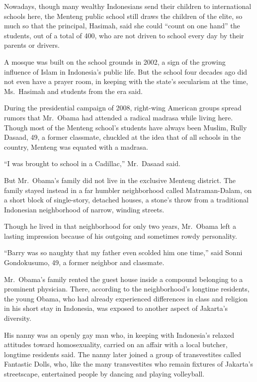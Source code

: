 ﻿\documentclass[12pt]{article}
\begin{document}
Nowadays, though many wealthy Indonesians send their children to international schools here, the
Menteng public school still draws the children of the elite, so much so that the principal, Hasimah,
said she could ``count on one hand'' the students, out of a total of 400, who are not driven to
school every day by their parents or drivers.

A mosque was built on the school grounds in 2002, a sign of the growing influence of Islam in
Indonesia's public life. But the school four decades ago did not even have a prayer room, in keeping
with the state's secularism at the time, Ms.~Hasimah and students from the era said.

During the presidential campaign of 2008, right-wing American groups spread rumors that Mr.~Obama
had attended a radical madrasa while living here. Though most of the Menteng school's students have
always been Muslim, Rully Dasaad, 49, a former classmate, chuckled at the idea that of all schools
in the country, Menteng was equated with a madrasa.

``I was brought to school in a Cadillac,'' Mr.~Dasaad said.

But Mr.~Obama's family did not live in the exclusive Menteng district. The family stayed instead in
a far humbler neighborhood called Matraman-Dalam, on a short block of single-story, detached houses,
a stone's throw from a traditional Indonesian neighborhood of narrow, winding streets.

Though he lived in that neighborhood for only two years, Mr.~Obama left a lasting impression because
of his outgoing and sometimes rowdy personality.

``Barry was so naughty that my father even scolded him one time,'' said Sonni Gondokusumo, 49, a
former neighbor and classmate.

Mr.~Obama's family rented the guest house inside a compound belonging to a prominent physician.
There, according to the neighborhood's longtime residents, the young Obama, who had already
experienced differences in class and religion in his short stay in Indonesia, was exposed to another
aspect of Jakarta's diversity.

His nanny was an openly gay man who, in keeping with Indonesia's relaxed attitudes toward
homosexuality, carried on an affair with a local butcher, longtime residents said. The nanny later
joined a group of transvestites called Fantastic Dolls, who, like the many transvestites who remain
fixtures of Jakarta's streetscape, entertained people by dancing and playing volleyball.
\end{document}
